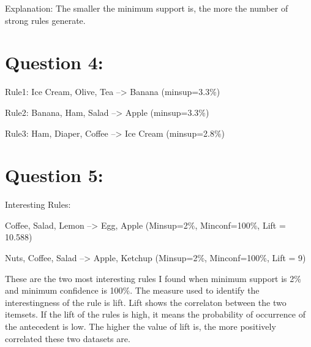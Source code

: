 \documentclass[titlepage]{article}
\begin{document}
Explanation: The smaller the minimum support is, the more the number of strong rules generate.

\section{Question 4:}
\label{sec:orge665852}
Rule1: Ice Cream, Olive, Tea --> Banana (minsup=3.3\%)

Rule2: Banana, Ham, Salad --> Apple (minsup=3.3\%)

Rule3: Ham, Diaper, Coffee --> Ice Cream (minsup=2.8\%)

\section{Question 5:}
\label{sec:org8b3ce28}
Interesting Rules:

Coffee, Salad, Lemon --> Egg, Apple   (Minsup=2\%, Minconf=100\%, Lift = 10.588)

Nuts, Coffee, Salad --> Apple, Ketchup     (Minsup=2\%, Minconf=100\%, Lift = 9)

These are the two most interesting rules I found when minimum support is 2\%
and minimum confidence is 100\%. The measure used to identify the
interestingness of the rule is lift. Lift shows the correlaton between the two
itemsets. If the lift of the rules is high, it means the probability of
occurrence of the antecedent is low. The higher the value of lift is, the more
positively correlated these two datasets are.
\end{document}
